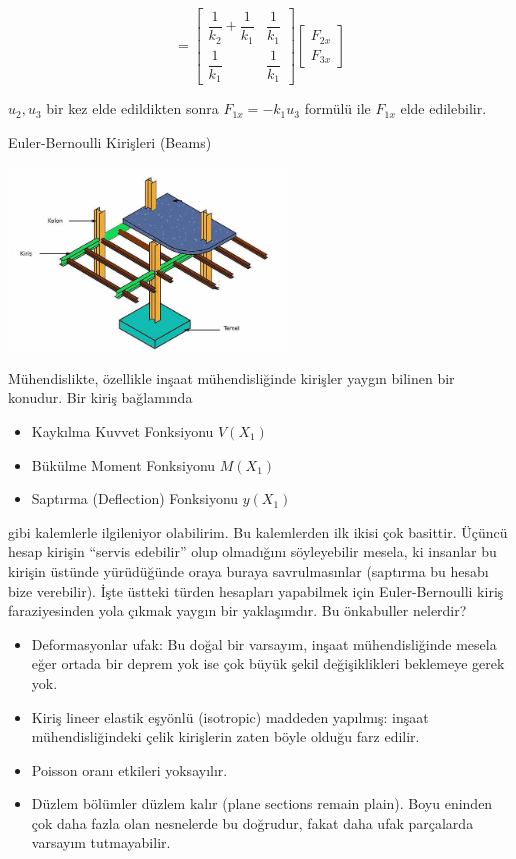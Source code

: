 \documentclass[12pt,fleqn]{article}\usepackage{../../common}
\begin{document}
$$
= \left[\begin{array}{cc}
\dfrac{1}{k_2} + \dfrac{1}{k_1} & \dfrac{1}{k_1} \\
\dfrac{1}{k_1} & \dfrac{1}{k_1} 
\end{array}\right]
\left[\begin{array}{c}
F_{2x} \\ F_{3x}
\end{array}\right]
$$

$u_2,u_3$ bir kez elde edildikten sonra $F_{1x} = -k_1 u_3$ formülü
ile $F_{1x}$ elde edilebilir.

Euler-Bernoulli Kirişleri (Beams)

\includegraphics[width=20em]{phy_020_strs_02_09.jpg}

Mühendislikte, özellikle inşaat mühendisliğinde kirişler yaygın bilinen
bir konudur. Bir kiriş bağlamında

\begin{itemize}
   \item Kaykılma Kuvvet Fonksiyonu $V(X_1)$
   \item Bükülme Moment Fonksiyonu $M(X_1)$
   \item Saptırma (Deflection) Fonksiyonu $y(X_1)$
\end{itemize}

gibi kalemlerle ilgileniyor olabilirim. Bu kalemlerden ilk ikisi çok basittir.
Üçüncü hesap kirişin ``servis edebilir'' olup olmadığını söyleyebilir mesela, ki
insanlar bu kirişin üstünde yürüdüğünde oraya buraya savrulmasınlar (saptırma bu
hesabı bize verebilir). İşte üstteki türden hesapları yapabilmek için
Euler-Bernoulli kiriş faraziyesinden yola çıkmak yaygın bir yaklaşımdır.  Bu
önkabuller nelerdir?

\begin{itemize}
   \item Deformasyonlar ufak: Bu doğal bir varsayım, inşaat mühendisliğinde
     mesela eğer ortada bir deprem yok ise çok büyük şekil değişiklikleri
     beklemeye gerek yok. 
   \item Kiriş lineer elastik eşyönlü (isotropic) maddeden yapılmış: inşaat
     mühendisliğindeki çelik kirişlerin zaten böyle olduğu farz edilir.
   \item Poisson oranı etkileri yoksayılır.
   \item Düzlem bölümler düzlem kalır (plane sections remain plain). Boyu
     eninden çok daha fazla olan nesnelerde bu doğrudur, fakat daha ufak
     parçalarda varsayım tutmayabilir.
\end{itemize}
\end{document}
